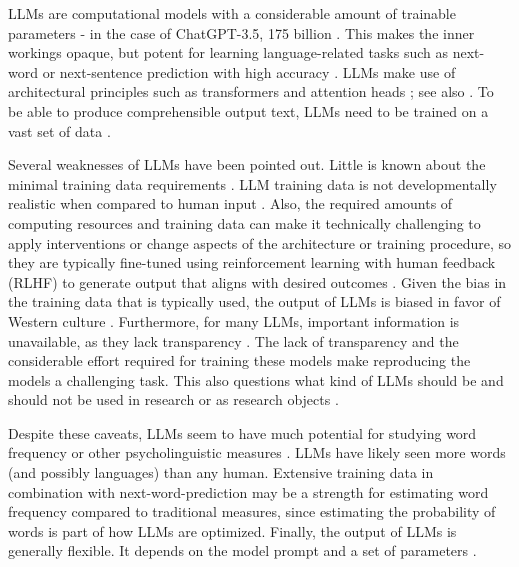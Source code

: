 \documentclass[manuscript]{stjour}
\begin{document}
LLMs are computational models with a considerable amount of trainable parameters - in the case of ChatGPT-3.5, 175 billion \citep{brown_language_2020}. This makes the inner workings opaque, but potent for learning language-related tasks such as next-word or next-sentence prediction with high accuracy \citep[e.g.,][]{devlin2019bertpretrainingdeepbidirectional}. LLMs make use of architectural principles such as transformers and attention heads \citep{vaswani_attention_2017}; see also \citep[for an introduction]{hussain_tutorial_2024}. To be able to produce comprehensible output text, LLMs need to be trained on a vast set of data \citep{bender_dangers_2021}. 

Several weaknesses of LLMs have been pointed out. Little is known about the minimal training data requirements \citep{hosseini_artificial_2022}. LLM training data is not developmentally realistic when compared to human input \citep{evanson_language_2023, warstadt_findings_2023, feng_is_2024}. Also, the required amounts of computing resources and training data can make it technically challenging to apply interventions or change aspects of the architecture or training procedure, so they are typically fine-tuned using reinforcement learning with human feedback (RLHF) to generate output that aligns with desired outcomes \citep[see][for how to remove troubling model outputs]{ouyang_training_2022}. Given the bias in the training data that is typically used, the output of LLMs is biased in favor of Western culture \citep{atari_which_2023}. Furthermore, for many LLMs, important information is unavailable, as they lack transparency \citep{liesenfeld_opening_2023, frank_openly_2023}. The lack of transparency and the considerable effort required for training these models make reproducing the models a challenging task. This also questions what kind of LLMs should be and should not be used in research or as research objects \citep{bender_dangers_2021, liesenfeld_opening_2023}. 

Despite these caveats, LLMs seem to have much potential for studying word frequency \citep{oh_frequency_2024} or other psycholinguistic measures \citep{martinez2024ai}. LLMs have likely seen more words (and possibly languages) than any human. Extensive training data in combination with next-word-prediction may be a strength for estimating word frequency compared to traditional measures, since estimating the probability of words is part of how LLMs are optimized. Finally, the output of LLMs is generally flexible. It depends on the model prompt and a set of parameters \citep[for the temperature parameter: higher values lead to greater lexical diversity in the generated text, similar to exploration in humans][]{momennejad_evaluating_2023}. 
\end{document}
